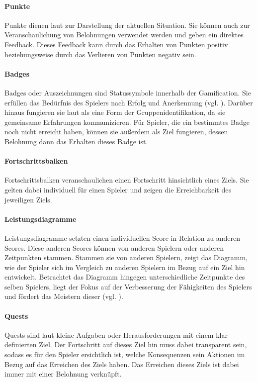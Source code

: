 \documentclass[
	oneside,  %
	ngerman, 
	final, 
	11pt, 
	a4paper, 
	1.1headlines, 
	headinclude=false, 
	footinclude=false, 
	mpinclude=false, 
	pagesize, 
	onecolumn, 
	titlepage, 
	parskip=half, 
	headsepline, 
	chapterprefix=false, 
	version=first, 
	listof=totoc, 
	bibliography=totoc, 
	toc=graduated, 
	fleqn
]{scrbook}
\begin{document}
\paragraph{Punkte}
Punkte dienen laut \cite{SH2014} zur Darstellung der aktuellen Situation.
Sie können auch zur Veranschaulichung von Belohnungen verwendet werden und geben ein direktes Feedback.
Dieses Feedback kann durch das Erhalten von Punkten positiv beziehungsweise durch das Verlieren von Punkten negativ sein.

\paragraph{Badges}
Badges oder Auszeichnungen sind Statussymbole innerhalb der Gamification.
Sie erfüllen das Bedürfnis des Spielers nach Erfolg und Anerkennung (vgl. \cite{SH2014}).
Darüber hinaus fungieren sie laut \cite{SH2014} als eine Form der Gruppenidentifikation, da sie gemeinsame Erfahrungen kommunizieren.
Für Spieler, die ein bestimmtes Badge noch nicht erreicht haben, können sie außerdem als Ziel fungieren, dessen Belohnung dann das Erhalten dieses Badge ist.

\paragraph{Fortschrittsbalken}
Fortschrittsbalken veranschaulichen einen Fortschritt hinsichtlich eines Ziels.
Sie gelten dabei individuell für einen Spieler und zeigen die Erreichbarkeit des jeweiligen Ziels.

\paragraph{Leistungsdiagramme}
Leistungsdiagramme setzten einen individuellen Score in Relation zu anderen Scores.
Diese anderen Scores können von anderen Spielern oder anderen Zeitpunkten stammen.
Stammen sie von anderen Spielern, zeigt das Diagramm, wie der Spieler sich im Vergleich zu anderen Spielern im Bezug auf ein Ziel hin entwickelt.
Betrachtet das Diagramm hingegen unterschiedliche Zeitpunkte des selben Spielers, liegt der Fokus auf der Verbesserung der Fähigkeiten des Spielers und fördert das Meistern dieser (vgl. \cite{SH2014}). 

\paragraph{Quests}
Quests sind laut \cite{SH2014} kleine Aufgaben oder Herausforderungen mit einem klar definierten Ziel.
Der Fortschritt auf dieses Ziel hin muss dabei transparent sein, sodass es für den Spieler ersichtlich ist, welche Konsequenzen sein Aktionen im Bezug auf das Erreichen des Ziels haben.
Das Erreichen dieses Ziels ist dabei immer mit einer Belohnung verknüpft.
\end{document}
